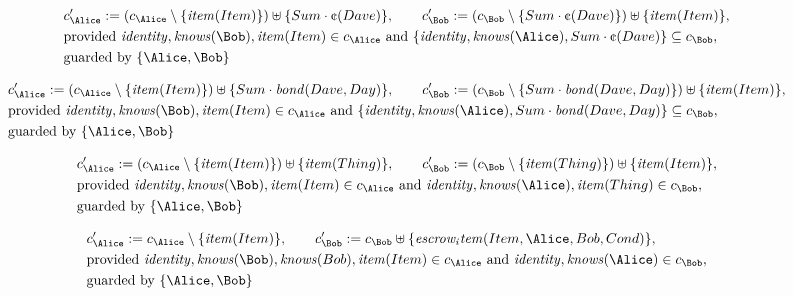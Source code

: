\begin{align*}
&
c'_
{
\Alice
}
 := 
(c_
{
\Alice
}
 \setminus 
\{
\mathit{
item
}
(
Item
)
\}
) \uplus 
\{
Sum
\cdot
\text{\textcent}
(
Dave
)
\}
, \qquad 
c'_
{
\Bob
}
 := 
(c_
{
\Bob
}
 \setminus 
\{
Sum
\cdot
\text{\textcent}
(
Dave
)
\}
) \uplus 
\{
\mathit{
item
}
(
Item
)
\}
,\\
&
\text{provided } 
\mathit{
identity
}
,
\mathit{
knows
}
(
\Bob
)
,
\mathit{
item
}
(
Item
)
 \in c_
{
\Alice
}
 \text{ and } 
\{
\mathit{
identity
}
,
\mathit{
knows
}
(
\Alice
)
,
Sum
\cdot
\text{\textcent}
(
Dave
)
\}
 \subseteq c_
{
\Bob
}
,\\
&
\text{guarded by } \{
\Alice
,
\Bob
\}
\end{align*}

\begin{align*}
&
c'_
{
\Alice
}
 := 
(c_
{
\Alice
}
 \setminus 
\{
\mathit{
item
}
(
Item
)
\}
) \uplus 
\{
Sum
\cdot
\mathit{
bond
}
(
Dave
,
Day
)
\}
, \qquad 
c'_
{
\Bob
}
 := 
(c_
{
\Bob
}
 \setminus 
\{
Sum
\cdot
\mathit{
bond
}
(
Dave
,
Day
)
\}
) \uplus 
\{
\mathit{
item
}
(
Item
)
\}
,\\
&
\text{provided } 
\mathit{
identity
}
,
\mathit{
knows
}
(
\Bob
)
,
\mathit{
item
}
(
Item
)
 \in c_
{
\Alice
}
 \text{ and } 
\{
\mathit{
identity
}
,
\mathit{
knows
}
(
\Alice
)
,
Sum
\cdot
\mathit{
bond
}
(
Dave
,
Day
)
\}
 \subseteq c_
{
\Bob
}
,\\
&
\text{guarded by } \{
\Alice
,
\Bob
\}
\end{align*}

\begin{align*}
&
c'_
{
\Alice
}
 := 
(c_
{
\Alice
}
 \setminus 
\{
\mathit{
item
}
(
Item
)
\}
) \uplus 
\{
\mathit{
item
}
(
Thing
)
\}
, \qquad 
c'_
{
\Bob
}
 := 
(c_
{
\Bob
}
 \setminus 
\{
\mathit{
item
}
(
Thing
)
\}
) \uplus 
\{
\mathit{
item
}
(
Item
)
\}
,\\
&
\text{provided } 
\mathit{
identity
}
,
\mathit{
knows
}
(
\Bob
)
,
\mathit{
item
}
(
Item
)
 \in c_
{
\Alice
}
 \text{ and } 
\mathit{
identity
}
,
\mathit{
knows
}
(
\Alice
)
,
\mathit{
item
}
(
Thing
)
 \in c_
{
\Bob
}
,\\
&
\text{guarded by } \{
\Alice
,
\Bob
\}
\end{align*}

\begin{align*}
&
c'_
{
\Alice
}
 := 
c_
{
\Alice
}
 \setminus 
\{
\mathit{
item
}
(
Item
)
\}
, \qquad 
c'_
{
\Bob
}
 := 
c_
{
\Bob
}
 \uplus 
\{
\mathit{
escrow_item
}
(
Item
,
\Alice
,
Bob
,
Cond
)
\}
,\\
&
\text{provided } 
\mathit{
identity
}
,
\mathit{
knows
}
(
\Bob
)
,
\mathit{
knows
}
(
Bob
)
,
\mathit{
item
}
(
Item
)
 \in c_
{
\Alice
}
 \text{ and } 
\mathit{
identity
}
,
\mathit{
knows
}
(
\Alice
)
 \in c_
{
\Bob
}
,\\
&
\text{guarded by } \{
\Alice
,
\Bob
\}
\end{align*}
